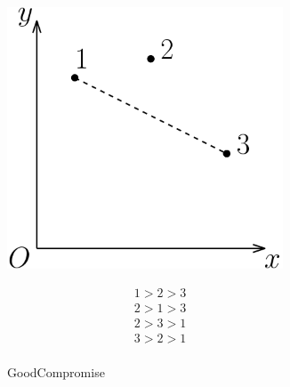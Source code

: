 \documentclass[12pt]{article}
\newcommand{\1}[1]{\mathds{1}[{#1}]}
\begin{document}
  \begin{figure}[h]
    \centering
    \begin{subfigure}[t]{0.45\textwidth}
      \begin{minipage}{0.55\textwidth}
        \includegraphics[width=0.9\textwidth]{figures/exGoodComp}
      \end{minipage}\hfill
      \begin{minipage}{0.45\textwidth}
        \begin{align*}
          1 > 2 > 3 \\
          2 > 1 > 3 \\
          2 > 3 > 1 \\
          3 > 2 > 1 \\
        \end{align*}
      \end{minipage}
      \caption{{\sc GoodCompromise}}
      \label{fig:gull}
    \end{subfigure}
    \quad \quad \quad
    \begin{subfigure}[t]{0.45\textwidth}
      \begin{minipage}{0.55\textwidth}

\end{minipage}
\end{subfigure}
\end{figure}
\end{document}
